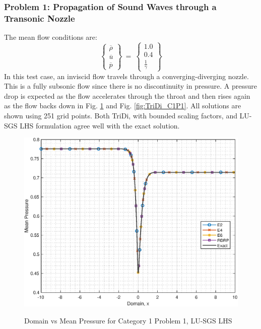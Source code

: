 \documentclass[conf]{new-aiaa}
\begin{document}
\subsubsection{Problem 1: Propagation of Sound Waves through a Transonic Nozzle}
The mean flow conditions are: 
\begin{equation*}
	\left\{
	\begin{matrix}
		\overline{\rho} \\
		\overline{u} \\
		\overline{p}
	\end{matrix}
	\right\}~=~
	\left\{
	\begin{matrix}
		1.0 \\
		0.4 \\
		\frac{1}{\gamma}
	\end{matrix}
	\right\}
\end{equation*}
In this test case, an inviscid flow travels through a converging-diverging nozzle. 
This is a fully subsonic flow since there is no discontinuity in pressure.
A pressure drop is expected as the flow accelerates through the throat and then rises again as the flow backs down in Fig. \ref{fig:LUSGS_C1P1} and Fig. \ref{fig:TriDi_C1P1}. 
All solutions are shown using 251 grid points. 
Both TriDi, with bounded scaling factors, and LU-SGS LHS formulation agree well with the exact solution.


\begin{figure}[hbtp!]
	\centering
	{\includegraphics[width=.7\textwidth]{Figures/LUSGS_C1P1}}
	\caption{Domain vs Mean Pressure for Category 1 Problem 1, LU-SGS LHS}
	\label{fig:LUSGS_C1P1}
\end{figure}
\end{document}
